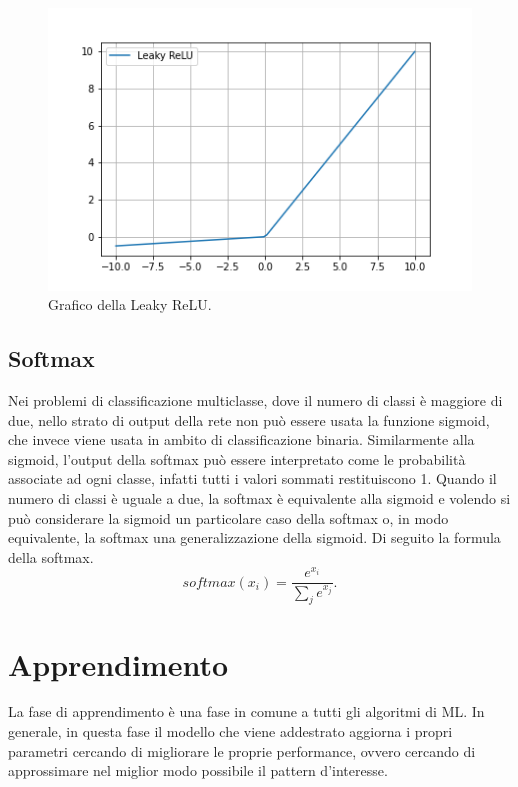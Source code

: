 \begin{figure}[h!]
  \hspace*{0.9in}
  \includegraphics[scale=0.6]{img/leaky_relu.png}
  \caption{Grafico della Leaky ReLU.}
  \label{fig:leaky_relu}
\end{figure}






\subsection{Softmax}
Nei problemi di classificazione multiclasse, dove il numero di classi è maggiore di due, nello strato di output della rete non può essere usata la funzione sigmoid, che invece viene usata in ambito di classificazione binaria. Similarmente alla sigmoid, l'output della softmax può essere interpretato come le probabilità associate ad ogni classe, infatti tutti i valori sommati restituiscono 1. Quando il numero di classi è uguale a due, la softmax è equivalente alla sigmoid e volendo si può considerare la sigmoid un particolare caso della softmax o, in modo equivalente, la softmax una generalizzazione della sigmoid.
Di seguito la formula della softmax.
\\

\begin{equation}
softmax(x_{i}) = \frac{e^{x_{i}}}{\sum_{j}{e^{x_{j}}}}.
\end{equation}





\section{Apprendimento}
La fase di apprendimento è una fase in comune a tutti gli algoritmi di ML. In generale, in questa fase il modello che viene addestrato aggiorna i propri parametri cercando di migliorare le proprie performance, ovvero cercando di approssimare nel miglior modo possibile il pattern d'interesse.

